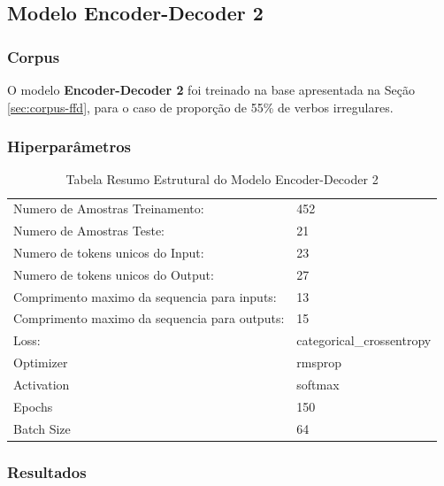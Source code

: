 \subsection{Modelo Encoder-Decoder 2}

\subsubsection{Corpus}
O modelo \textbf{Encoder-Decoder 2} foi treinado na base apresentada na Seção \ref{sec:corpus-ffd}, para o caso de proporção de 55\% de verbos irregulares. 

\subsubsection{Hiperparâmetros} 

\begin{table}[H]
\centering
\begin{tabular}{ll}
Numero de Amostras Treinamento: & 452 \\
Numero de Amostras Teste: & 21 \\
Numero de tokens unicos do Input: & 23 \\
Numero de tokens unicos do Output: & 27 \\
Comprimento maximo da sequencia para inputs: & 13 \\
Comprimento maximo da sequencia para outputs: & 15 \\
Loss: & categorical\_crossentropy \\
Optimizer & rmsprop \\
Activation & softmax \\
Epochs & 150 \\
Batch Size & 64
\end{tabular}
\caption{Tabela Resumo Estrutural do Modelo Encoder-Decoder 2}
\label{tab:res1}
\end{table}

\subsubsection{Resultados}

